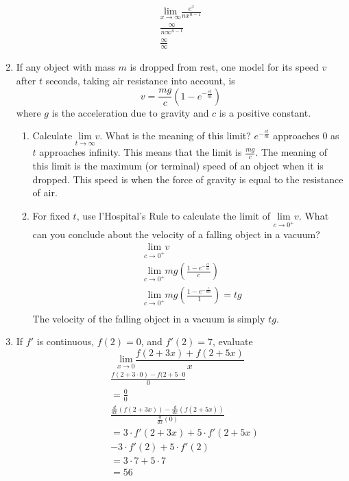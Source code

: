 \documentclass{article}
\begin{document}
\begin{enumerate}
	 $$\begin{aligned}
\underset{x\rightarrow \infty}{\text{lim}}\frac{e^x}{nx^{n-1}}\\
\frac{\infty}{n\infty^{n-1}}\\
\frac{\infty}{\infty}
\end{aligned}$$
\setcounter{enumi}{65}
	\item If any object with mass $m$ is dropped from rest, one model for its speed $v$ after $t$ seconds, taking air resistance into account, is $$v=\frac{mg}{c}(1-e^{-\frac{ct}{m}})$$ where $g$ is the acceleration due to gravity and $c$ is a positive constant. 
		\begin{enumerate}
			\item Calculate $\underset{t\rightarrow \infty}{\text{lim}}v$. What is the meaning of this limit?\newline
			$e^{-\frac{ct}{m}}$ approaches 0 as $t$ approaches infinity. This means that the limit is $\frac{mg}{c}$. The meaning of this limit is the maximum (or terminal) speed of an object when it is dropped. This speed is when the force of gravity is equal to the resistance of air.
			\item For fixed $t$, use l'Hospital's Rule to calculate the limit of $\underset{c\rightarrow 0^+}{\text{lim}}v$. What can you conclude about the velocity of a falling object in a vacuum?\newline
			$$\begin{align}
				&\underset{c\rightarrow 0^+}{\text{lim}}v\\
				&\underset{c\rightarrow 0^+} {\text{lim}} mg(\frac{1-e^{-\frac{ct}{m}}}{c})\\
				&\underset{c\rightarrow 0^+} {\text{lim}} mg(\frac{1-e^{-\frac{t}{me}}}{1})=tg\\
			\end{align}$$
			The velocity of the falling object in a vacuum is simply $tg$.
		\end{enumerate}
\setcounter{enumi}{72}
	\item If $f'$ is continuous, $f(2)=0$, and $f'(2)=7$, evaluate $$\underset{x\rightarrow 0}{\text{lim}} \frac{f(2+3x)+f(2+5x)}{x}$$\newline
	$$\begin{align}
		&\frac{f(2+3\cdot0)-f(2+5\cdot 0}{0}\\
		&=\frac{0}{0}\\
		&\frac{\frac{d}{dx}(f(2+3x))-\frac{d}{dx}(f(2+5x))}{\frac{d}{dx}(0)}\\
		&=3\cdot f'(2+3x)+5\cdot f'(2+5x)\\
		&-3\cdot f'(2)+ 5\cdot f'(2)\\
		&=3\cdot 7 + 5\cdot 7\\
		&= 56
	\end{align}$$
\end{enumerate}


%
\end{document}
